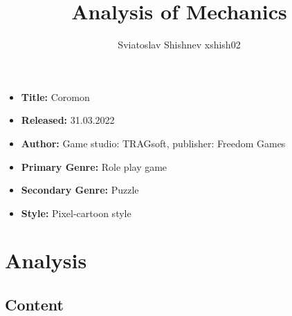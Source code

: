 \documentclass[a4paper,10pt,english]{article}
\title{%
Analysis of Mechanics%
}
\author{%
Sviatoslav Shishnev xshish02%
}
\date{}
\begin{document}
\maketitle
\thispagestyle{empty}

{%
\large

\begin{itemize}

\item[] \textbf{Title:} Coromon

\item[] \textbf{Released:} 31.03.2022

\item[] \textbf{Author:} Game studio: TRAGsoft, publisher: Freedom Games 

\item[] \textbf{Primary Genre:} Role play game

\item[] \textbf{Secondary Genre:} Puzzle

\item[] \textbf{Style:} Pixel-cartoon style 

\end{itemize}

}

\section*{\centering Analysis}

\subsection*{Content}
\end{document}
